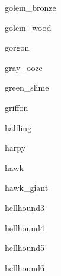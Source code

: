 \documentclass[letterpaper,serif]{module}
\begin{document}
\begin{newmonster}{golem_bronze}\end{newmonster}

\begin{newmonster}{golem_wood}\end{newmonster}

\begin{newmonster}{gorgon}\end{newmonster}

\begin{newmonster}{gray_ooze}\end{newmonster}

\begin{newmonster}{green_slime}\end{newmonster}

\begin{newmonster}{griffon}\end{newmonster}

\begin{newmonster}{halfling}\end{newmonster}

\begin{newmonster}{harpy}\end{newmonster}

\begin{newmonster}{hawk}\end{newmonster}

\begin{newmonster}{hawk_giant}\end{newmonster}

\begin{newmonster}{hellhound3}\end{newmonster}

\begin{newmonster}{hellhound4}\end{newmonster}

\begin{newmonster}{hellhound5}\end{newmonster}

\begin{newmonster}{hellhound6}\end{newmonster}
\end{document}

